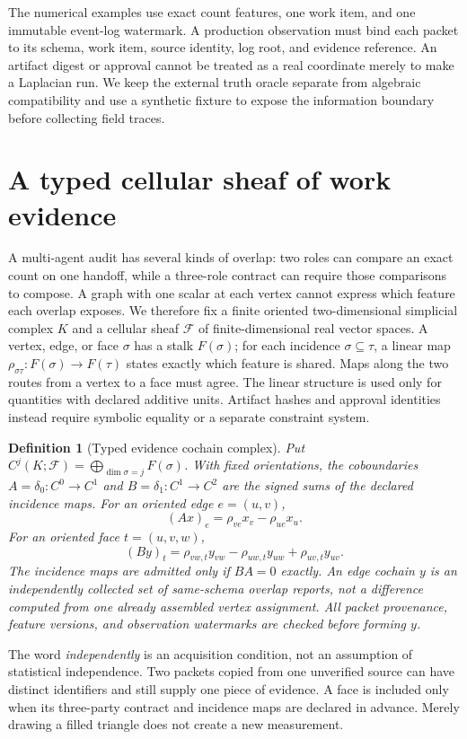 \documentclass[11pt,a4paper]{article}
\newtheorem{definition}{Definition}
\begin{document}
The numerical examples use exact count features, one work item, and one immutable event-log watermark. A production observation must bind each packet to its schema, work item, source identity, log root, and evidence reference. An artifact digest or approval cannot be treated as a real coordinate merely to make a Laplacian run. We keep the external truth oracle separate from algebraic compatibility and use a synthetic fixture to expose the information boundary before collecting field traces.

\section{A typed cellular sheaf of work evidence}\label{sec:typed-sheaf}
A multi-agent audit has several kinds of overlap: two roles can compare an exact count on one handoff, while a three-role contract can require those comparisons to compose. A graph with one scalar at each vertex cannot express which feature each overlap exposes. We therefore fix a finite oriented two-dimensional simplicial complex $K$ and a cellular sheaf $\mathcal F$ of finite-dimensional real vector spaces. A vertex, edge, or face $\sigma$ has a stalk $F(\sigma)$; for each incidence $\sigma\subseteq\tau$, a linear map $\rho_{\sigma\tau}:F(\sigma)\to F(\tau)$ states exactly which feature is shared. Maps along the two routes from a vertex to a face must agree. The linear structure is used only for quantities with declared additive units. Artifact hashes and approval identities instead require symbolic equality or a separate constraint system.

\begin{definition}[Typed evidence cochain complex]\label{def:cellular-sheaf}
Put $C^j(K;\mathcal F)=\bigoplus_{\dim\sigma=j}F(\sigma)$. With fixed orientations, the coboundaries $A=\delta_0:C^0\to C^1$ and $B=\delta_1:C^1\to C^2$ are the signed sums of the declared incidence maps. For an oriented edge $e=(u,v)$,
\[
(Ax)_e=\rho_{ve}x_v-\rho_{ue}x_u.
\]
For an oriented face $t=(u,v,w)$,
\[
(By)_t=\rho_{vw,t}y_{vw}-\rho_{uw,t}y_{uw}+\rho_{uv,t}y_{uv}.
\]
The incidence maps are admitted only if $BA=0$ exactly. An edge cochain $y$ is an independently collected set of same-schema overlap reports, not a difference computed from one already assembled vertex assignment. All packet provenance, feature versions, and observation watermarks are checked before forming $y$.
\end{definition}

The word \emph{independently} is an acquisition condition, not an assumption of statistical independence. Two packets copied from one unverified source can have distinct identifiers and still supply one piece of evidence. A face is included only when its three-party contract and incidence maps are declared in advance. Merely drawing a filled triangle does not create a new measurement.
\end{document}
